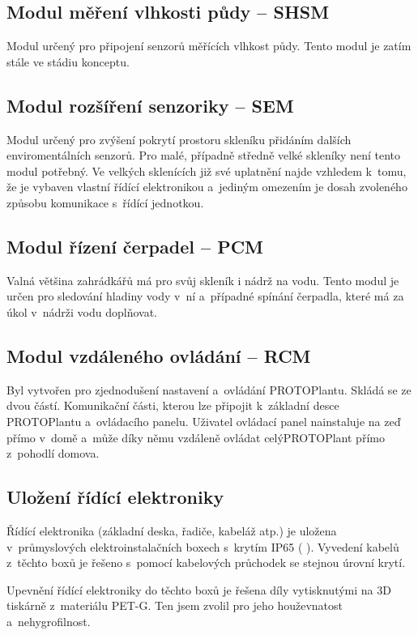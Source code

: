\subsection{Modul měření vlhkosti půdy -- SHSM}
\label{subsec:SHSM}
Modul určený pro připojení senzorů měřících vlhkost půdy.
Tento modul je zatím stále ve stádiu konceptu.

\subsection{Modul rozšíření senzoriky -- SEM}
\label{subsec:SEM}
Modul určený pro zvýšení pokrytí prostoru skleníku přidáním dalších enviromentálních senzorů.
Pro malé, případně středně velké skleníky není tento modul potřebný. 
Ve velkých sklenících již své uplatnění najde vzhledem k~tomu, že je vybaven vlastní řídící elektronikou a~jediným omezením je dosah zvoleného způsobu komunikace s~řídící jednotkou.

\subsection{Modul řízení čerpadel -- PCM}
\label{subsec:PCM}
Valná většina zahrádkářů má pro svůj skleník i nádrž na vodu.
Tento modul je určen pro sledování hladiny vody v~ní a~případné spínání čerpadla, které má za úkol v~nádrži vodu doplňovat.

\subsection{Modul vzdáleného ovládání -- RCM}
\label{subsec:RCM}
Byl vytvořen pro zjednodušení nastavení a~ovládání PROTOPlantu.
Skládá se ze dvou částí. 
Komunikační části, kterou lze připojit k~základní desce PROTOPlantu a~ovládacího panelu. 
Uživatel ovládací panel nainstaluje na zeď přímo v~domě a~může díky němu vzdáleně ovládat celýPROTOPlant přímo z~pohodlí domova. 

\subsection{Uložení řídící elektroniky}
Řídící elektronika (základní deska, řadiče, kabeláž atp.) je uložena v~průmyslových elektroinstalačních boxech s~krytím IP65 ( \cite{IP_ratings}).
Vyvedení kabelů z~těchto boxů je řešeno s~pomocí kabelových průchodek se stejnou úrovní krytí.

Upevnění řídící elektroniky do těchto boxů je řešena díly vytisknutými na 3D tiskárně z~materiálu PET-G.
Ten jsem zvolil pro jeho houževnatost a~nehygrofilnost.

